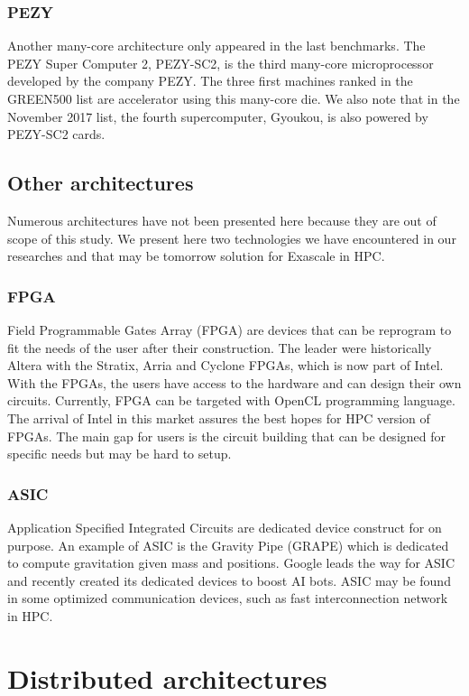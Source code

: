 \subsubsection{PEZY}
Another many-core architecture only appeared in the last benchmarks. 
The PEZY Super Computer 2, PEZY-SC2, is the third many-core microprocessor developed by the company PEZY. 
The three first machines ranked in the GREEN500 list are accelerator using this many-core die. 
We also note that in the November 2017 list, the fourth supercomputer, Gyoukou, is also powered by PEZY-SC2 cards.

\subsection{Other architectures}
Numerous architectures have not been presented here because they are out of scope of this study. 
We present here two technologies we have encountered in our researches and that may be tomorrow solution for Exascale in HPC. 
\subsubsection{FPGA}
Field Programmable Gates Array (FPGA) are devices that can be reprogram to fit the needs of the user after their construction.
The leader were historically Altera with the Stratix, Arria and Cyclone FPGAs, which is now part of Intel. 
With the FPGAs, the users have access to the hardware and can design their own circuits. 
Currently, FPGA can be targeted with OpenCL programming language. 
The arrival of Intel in this market assures the best hopes for HPC version of FPGAs. 
The main gap for users is the circuit building that can be designed for specific needs but may be hard to setup. 
\subsubsection{ASIC}
Application Specified Integrated Circuits are dedicated device construct for on purpose. 
An example of ASIC is the Gravity Pipe (GRAPE) which is dedicated to compute gravitation given mass and positions.
Google leads the way for ASIC and recently created its dedicated devices to boost AI bots.
ASIC may be found in some optimized communication devices, such as fast interconnection network in HPC.  

\section{Distributed architectures}

